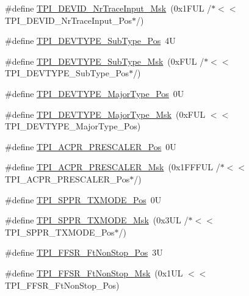 \begin{DoxyCompactItemize}
\item 
\#define \hyperlink{group___c_m_s_i_s___t_p_i_gabed454418d2140043cd65ec899abd97f}{T\+P\+I\+\_\+\+D\+E\+V\+I\+D\+\_\+\+Nr\+Trace\+Input\+\_\+\+Msk}~(0x1\+F\+U\+L /$\ast$$<$$<$ T\+P\+I\+\_\+\+D\+E\+V\+I\+D\+\_\+\+Nr\+Trace\+Input\+\_\+\+Pos$\ast$/)
\item 
\#define \hyperlink{group___c_m_s_i_s___t_p_i_ga0c799ff892af5eb3162d152abc00af7a}{T\+P\+I\+\_\+\+D\+E\+V\+T\+Y\+P\+E\+\_\+\+Sub\+Type\+\_\+\+Pos}~4U
\item 
\#define \hyperlink{group___c_m_s_i_s___t_p_i_ga5b2fd7dddaf5f64855d9c0696acd65c1}{T\+P\+I\+\_\+\+D\+E\+V\+T\+Y\+P\+E\+\_\+\+Sub\+Type\+\_\+\+Msk}~(0x\+F\+U\+L /$\ast$$<$$<$ T\+P\+I\+\_\+\+D\+E\+V\+T\+Y\+P\+E\+\_\+\+Sub\+Type\+\_\+\+Pos$\ast$/)
\item 
\#define \hyperlink{group___c_m_s_i_s___t_p_i_ga69c4892d332755a9f64c1680497cebdd}{T\+P\+I\+\_\+\+D\+E\+V\+T\+Y\+P\+E\+\_\+\+Major\+Type\+\_\+\+Pos}~0U
\item 
\#define \hyperlink{group___c_m_s_i_s___t_p_i_gaecbceed6d08ec586403b37ad47b38c88}{T\+P\+I\+\_\+\+D\+E\+V\+T\+Y\+P\+E\+\_\+\+Major\+Type\+\_\+\+Msk}~(0x\+F\+U\+L $<$$<$ T\+P\+I\+\_\+\+D\+E\+V\+T\+Y\+P\+E\+\_\+\+Major\+Type\+\_\+\+Pos)
\item 
\#define \hyperlink{group___c_m_s_i_s___t_p_i_ga5a82d274eb2df8b0c92dd4ed63535928}{T\+P\+I\+\_\+\+A\+C\+P\+R\+\_\+\+P\+R\+E\+S\+C\+A\+L\+E\+R\+\_\+\+Pos}~0U
\item 
\#define \hyperlink{group___c_m_s_i_s___t_p_i_ga4fcacd27208419929921aec8457a8c13}{T\+P\+I\+\_\+\+A\+C\+P\+R\+\_\+\+P\+R\+E\+S\+C\+A\+L\+E\+R\+\_\+\+Msk}~(0x1\+F\+F\+F\+U\+L /$\ast$$<$$<$ T\+P\+I\+\_\+\+A\+C\+P\+R\+\_\+\+P\+R\+E\+S\+C\+A\+L\+E\+R\+\_\+\+Pos$\ast$/)
\item 
\#define \hyperlink{group___c_m_s_i_s___t_p_i_ga0f302797b94bb2da24052082ab630858}{T\+P\+I\+\_\+\+S\+P\+P\+R\+\_\+\+T\+X\+M\+O\+D\+E\+\_\+\+Pos}~0U
\item 
\#define \hyperlink{group___c_m_s_i_s___t_p_i_gaca085c8a954393d70dbd7240bb02cc1f}{T\+P\+I\+\_\+\+S\+P\+P\+R\+\_\+\+T\+X\+M\+O\+D\+E\+\_\+\+Msk}~(0x3\+U\+L /$\ast$$<$$<$ T\+P\+I\+\_\+\+S\+P\+P\+R\+\_\+\+T\+X\+M\+O\+D\+E\+\_\+\+Pos$\ast$/)
\item 
\#define \hyperlink{group___c_m_s_i_s___t_p_i_ga9537b8a660cc8803f57cbbee320b2fc8}{T\+P\+I\+\_\+\+F\+F\+S\+R\+\_\+\+Ft\+Non\+Stop\+\_\+\+Pos}~3U
\item 
\#define \hyperlink{group___c_m_s_i_s___t_p_i_gaaa313f980974a8cfc7dac68c4d805ab1}{T\+P\+I\+\_\+\+F\+F\+S\+R\+\_\+\+Ft\+Non\+Stop\+\_\+\+Msk}~(0x1\+U\+L $<$$<$ T\+P\+I\+\_\+\+F\+F\+S\+R\+\_\+\+Ft\+Non\+Stop\+\_\+\+Pos)

\end{DoxyCompactItemize}
